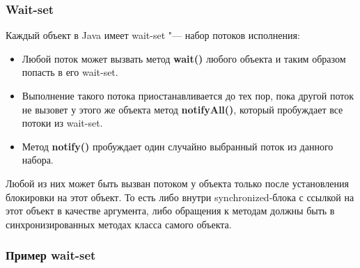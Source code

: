\documentclass[default]{beamer}
\begin{document}
	\begin{frame}
		\frametitle{Wait-set}
		
		Каждый объект в Java имеет wait-set "--- набор потоков исполнения:
		\begin{itemize}
			\item Любой поток может вызвать метод \textbf{wait()} любого объекта и таким образом попасть в его wait-set.
			\item Выполнение такого потока приостанавливается до тех пор, пока другой поток не вызовет у этого же объекта метод \textbf{notifyAll()}, который пробуждает все потоки из wait-set.
			\item Метод \textbf{notify()} пробуждает один случайно выбранный поток из данного набора.
		\end{itemize}
		
		Любой из них может быть вызван потоком у объекта только после установления блокировки на этот объект. То есть либо внутри synchronized-блока с ссылкой на этот объект в качестве аргумента, либо обращения к методам должны быть в синхронизированных методах класса самого объекта.
	\end{frame}	
	
\begin{frame}
	\frametitle{Пример wait-set}
	
	\begin{overlayarea}{\textwidth}{\textheight}
		\only<1>{
			\lstWLStart
		}
		\only<2>{
			\lstWLEnd
		}
	\end{overlayarea}
\end{frame}		
\end{document}
